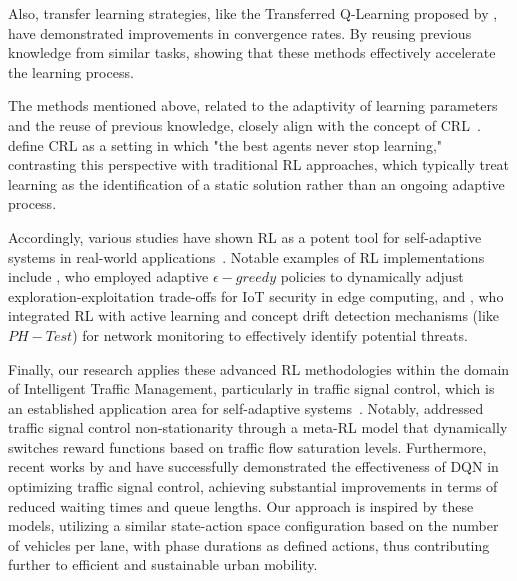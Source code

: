 Also, transfer learning strategies, like the Transferred Q-Learning proposed by \citet{chen2022transferredqlearning}, have demonstrated improvements in convergence rates. By reusing previous knowledge from similar tasks, showing that these methods effectively accelerate the learning process.

The methods mentioned above, related to the adaptivity of learning parameters and the reuse of previous knowledge, closely align with the concept of \ac{CRL}~\cite{khetarpal2022continualreinforcementlearningreview}. \citet{abel2023definitioncontinualreinforcementlearning} define \ac{CRL} as a setting in which "the best agents never stop learning," contrasting this perspective with traditional \ac{RL} approaches, which typically treat learning as the identification of a static solution rather than an ongoing adaptive process.

Accordingly, various studies have shown \ac{RL} as a potent tool for self-adaptive systems in real-world applications~\cite{HENRICHS2022106940}. Notable examples of \ac{RL} implementations include \citet{iotdynamicrl}, who employed adaptive $\epsilon-greedy$ policies to dynamically adjust exploration-exploitation trade-offs for IoT security in edge computing, and \citet{networkdynamicrl}, who integrated \ac{RL} with active learning and concept drift detection mechanisms (like $PH-Test$) for network monitoring to effectively identify potential threats.

Finally, our research applies these advanced \ac{RL} methodologies within the domain of Intelligent Traffic Management, particularly in traffic signal control, which is an established application area for self-adaptive systems~\cite{HENRICHS2022106940}. Notably, \citet{meta-rl-traffic} addressed traffic signal control non-stationarity through a meta-\ac{RL} model that dynamically switches reward functions based on traffic flow saturation levels. Furthermore, recent works by \citet{Swapno2024} and \citet{MORENOMALO2024124178} have successfully demonstrated the effectiveness of \acf{DQN} in optimizing traffic signal control, achieving substantial improvements in terms of reduced waiting times and queue lengths. Our approach is inspired by these models, utilizing a similar state-action space configuration based on the number of vehicles per lane, with phase durations as defined actions, thus contributing further to efficient and sustainable urban mobility.



\endinput

